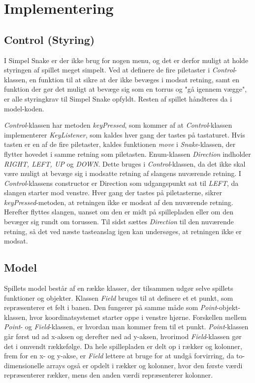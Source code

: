 \section{Implementering}
\subsection{Control (Styring)}
I Simpel Snake er der ikke brug for nogen menu, og det er derfor muligt at holde styringen af spillet meget simpelt. Ved at definere de fire piletaster i \textit{Control}-klassen, en funktion til at sikre at der ikke bevæges i modsat retning, samt en funktion der gør det muligt at bevæge sig som en torrus og "gå igennem vægge", er alle styringkrav til Simpel Snake opfyldt. Resten af spillet håndteres da i model-koden.

\textit{Control}-klassen har metoden \textit{keyPressed}, som kommer af at \textit{Control}-klassen implementerer \textit{KeyListener}, som kaldes hver gang der tastes på tastaturet. Hvis tasten er en af de fire piletaster, kaldes funktionen \textit{move} i \textit{Snake}-klassen, der flytter hovedet i samme retning som piletasten.
Enum-klassen \textit{Direction} indholder \textit{RIGHT, LEFT, UP} og \textit{DOWN}. Dette bruges i \textit{Control}-klassen, da det ikke skal være muligt at bevæge sig i modsatte retning af slangens nuværende retning.
I \textit{Control}-klassens constructor er Direction som udgangspunkt sat til \textit{LEFT}, da slangen starter mod venstre. Hver gang der tastes på piletasterne, sikrer \textit{keyPressed}-metoden, at retningen ikke er modsat af den nuværende retning. Herefter flyttes slangen, uanset om den er midt på spillepladen eller om den bevæger sig rundt om torussen. Til sidst sættes \textit{Direction} til den nuværende retning, så det ved næste tasteanslag igen kan undersøges, at retningen ikke er modsat.


\subsection{Model}
Spillets model består af en række klasser, der tilsammen udgør selve spillets funktioner og objekter.
Klassen \textit{Field} bruges til at definere et et punkt, som repræsenterer et felt i banen. Den fungerer på samme måde som \textit{Point}-objekt-klassen, hvor koordinatsystemet starter oppe i venstre hjørne. Forskellen mellem \textit{Point}- og \textit{Field}-klassen, er hvordan man kommer frem til et punkt. \textit{Point}-klassen går først ud ad x-aksen og derefter ned ad y-aksen, hvorimod \textit{Field}-klassen gør det i omvendt rækkefølge. Da hele spillepladen er delt op i rækker og kolonner, frem for en x- og y-akse, er \textit{Field} lettere at bruge for at undgå forvirring, da to-dimensionelle arrays også er opdelt i rækker og kolonner, hvor den første værdi repræsenterer rækker, mens den anden værdi repræsenterer kolonner.

